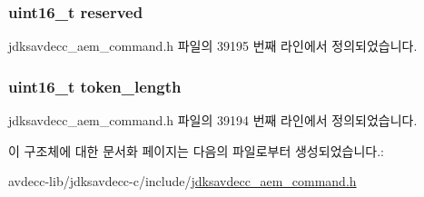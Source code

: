 \subsubsection[{\texorpdfstring{reserved}{reserved}}]{\setlength{\rightskip}{0pt plus 5cm}uint16\+\_\+t reserved}\hypertarget{structjdksavdecc__aem__command__auth__add__token_a5a6ed8c04a3db86066924b1a1bf4dad3}{}\label{structjdksavdecc__aem__command__auth__add__token_a5a6ed8c04a3db86066924b1a1bf4dad3}


jdksavdecc\+\_\+aem\+\_\+command.\+h 파일의 39195 번째 라인에서 정의되었습니다.

\subsubsection[{\texorpdfstring{token\+\_\+length}{token_length}}]{\setlength{\rightskip}{0pt plus 5cm}uint16\+\_\+t token\+\_\+length}\hypertarget{structjdksavdecc__aem__command__auth__add__token_a97da4c134a2723b8dbcd1c88d8577991}{}\label{structjdksavdecc__aem__command__auth__add__token_a97da4c134a2723b8dbcd1c88d8577991}


jdksavdecc\+\_\+aem\+\_\+command.\+h 파일의 39194 번째 라인에서 정의되었습니다.



이 구조체에 대한 문서화 페이지는 다음의 파일로부터 생성되었습니다.\+:\begin{DoxyCompactItemize}
\item 
avdecc-\/lib/jdksavdecc-\/c/include/\hyperlink{jdksavdecc__aem__command_8h}{jdksavdecc\+\_\+aem\+\_\+command.\+h}\end{DoxyCompactItemize}
